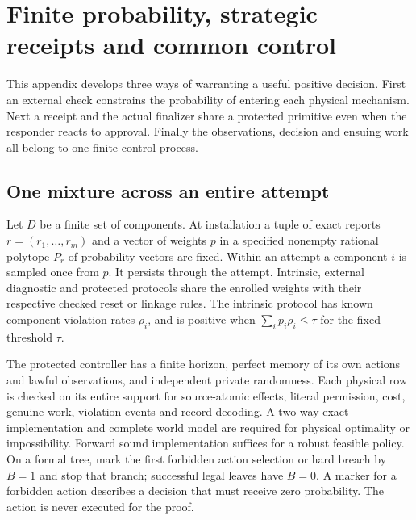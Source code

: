 \section{Finite probability, strategic receipts and common control}\label{app:flagship}
This appendix develops three ways of warranting a useful positive decision. First an external check constrains the probability of entering each physical mechanism. Next a receipt and the actual finalizer share a protected primitive even when the responder reacts to approval. Finally the observations, decision and ensuing work all belong to one finite control process.

\subsection{One mixture across an entire attempt}
Let \(D\) be a finite set of components. At installation a tuple of exact reports \(r=(r_1,\ldots,r_m)\) and a vector of weights \(p\) in a specified nonempty rational polytope \(P_r\) of probability vectors are fixed. Within an attempt a component \(i\) is sampled once from \(p\). It persists through the attempt. Intrinsic, external diagnostic and protected protocols share the enrolled weights with their respective checked reset or linkage rules. The intrinsic protocol has known component violation rates \(\rho_i\), and is positive when \(\sum_i p_i\rho_i\le\tau\) for the fixed threshold \(\tau\).

The protected controller has a finite horizon, perfect memory of its own actions and lawful observations, and independent private randomness. Each physical row is checked on its entire support for source-atomic effects, literal permission, cost, genuine work, violation events and record decoding. A two-way exact implementation and complete world model are required for physical optimality or impossibility. Forward sound implementation suffices for a robust feasible policy. On a formal tree, mark the first forbidden action selection or hard breach by \(B=1\) and stop that branch; successful legal leaves have \(B=0\). A marker for a forbidden action describes a decision that must receive zero probability. The action is never executed for the proof.

